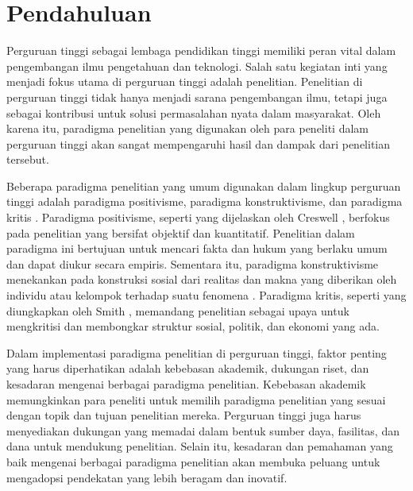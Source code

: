 \section{Pendahuluan}

Perguruan tinggi sebagai lembaga pendidikan tinggi memiliki peran vital dalam pengembangan ilmu pengetahuan dan teknologi. Salah satu kegiatan inti yang menjadi fokus utama di perguruan tinggi adalah penelitian. Penelitian di perguruan tinggi tidak hanya menjadi sarana pengembangan ilmu, tetapi juga sebagai kontribusi untuk solusi permasalahan nyata dalam masyarakat. Oleh karena itu, paradigma penelitian yang digunakan oleh para peneliti dalam perguruan tinggi akan sangat mempengaruhi hasil dan dampak dari penelitian tersebut.

Beberapa paradigma penelitian yang umum digunakan dalam lingkup perguruan tinggi adalah paradigma positivisme, paradigma konstruktivisme, dan paradigma kritis \cite{creswell2014research, guba1994competing, smith1983quantitative}. Paradigma positivisme, seperti yang dijelaskan oleh Creswell \cite{creswell2014research}, berfokus pada penelitian yang bersifat objektif dan kuantitatif. Penelitian dalam paradigma ini bertujuan untuk mencari fakta dan hukum yang berlaku umum dan dapat diukur secara empiris. Sementara itu, paradigma konstruktivisme menekankan pada konstruksi sosial dari realitas dan makna yang diberikan oleh individu atau kelompok terhadap suatu fenomena \cite{guba1994competing}. Paradigma kritis, seperti yang diungkapkan oleh Smith \cite{smith1983quantitative}, memandang penelitian sebagai upaya untuk mengkritisi dan membongkar struktur sosial, politik, dan ekonomi yang ada.

Dalam implementasi paradigma penelitian di perguruan tinggi, faktor penting yang harus diperhatikan adalah kebebasan akademik, dukungan riset, dan kesadaran mengenai berbagai paradigma penelitian. Kebebasan akademik memungkinkan para peneliti untuk memilih paradigma penelitian yang sesuai dengan topik dan tujuan penelitian mereka. Perguruan tinggi juga harus menyediakan dukungan yang memadai dalam bentuk sumber daya, fasilitas, dan dana untuk mendukung penelitian. Selain itu, kesadaran dan pemahaman yang baik mengenai berbagai paradigma penelitian akan membuka peluang untuk mengadopsi pendekatan yang lebih beragam dan inovatif.
